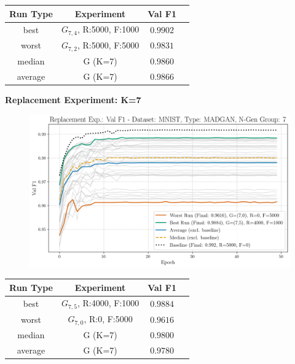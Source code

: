 \begin{table}[H]
	\vspace{-1em}
	\centering
	\begin{tabular}{|c|c|c|c|}
		\hline
		Run Type & Experiment & Val F1 \\ \hline
		best & \(G_{7, 4}\), R:5000, F:1000 & $0.9902$\\ \hline
		worst & \(G_{7, 2}\), R:5000, F:5000 & $0.9831$\\ \hline
		median & G (K=7) & $0.9860$\\ \hline
		average & G (K=7) & $0.9866$
		\\ \hline
	\end{tabular}
\end{table}
\noindent\textbf{Replacement Experiment: K=7}
\begin{figure}[htbp]
	\centering
	\includegraphics[width=.85\textwidth]{abb/strat_classifier_performance/MNIST_STRATIFIED_CLASSIFIERS_MADGAN_NEW/replacement_experiments/val_f1_score_MADGAN_MNIST_n_gen_7_all.png}
	\label{fig:app_strat_class_performance_replacement_exp._val_f1_score_7}
\end{figure}
\begin{table}[H]
	\vspace{-1em}
	\centering
	\begin{tabular}{|c|c|c|c|}
		\hline
		Run Type & Experiment & Val F1 \\ \hline
		best & \(G_{7, 5}\), R:4000, F:1000 & $0.9884$\\ \hline
		worst & \(G_{7, 0}\), R:0, F:5000 & $0.9616$\\ \hline
		median & G (K=7) & $0.9800$\\ \hline
		average & G (K=7) & $0.9780$
		\\ \hline
	\end{tabular}
\end{table}
